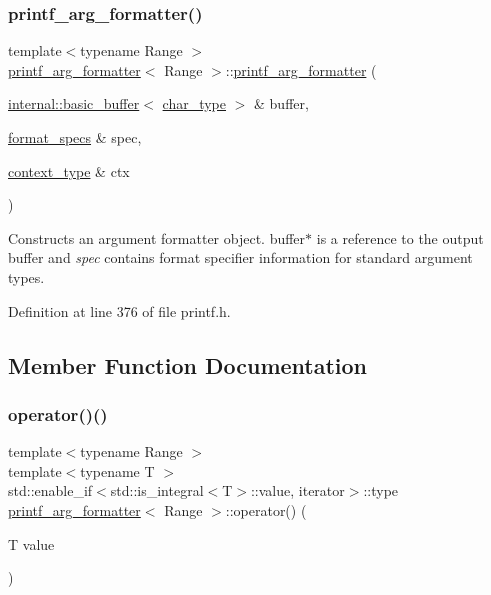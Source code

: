 \subsubsection{\texorpdfstring{printf\+\_\+arg\+\_\+formatter()}{printf\_arg\_formatter()}}
{\footnotesize\ttfamily template$<$typename Range $>$ \\
\hyperlink{classprintf__arg__formatter}{printf\+\_\+arg\+\_\+formatter}$<$ Range $>$\+::\hyperlink{classprintf__arg__formatter}{printf\+\_\+arg\+\_\+formatter} (\begin{DoxyParamCaption}\item[{\hyperlink{classinternal_1_1basic__buffer}{internal\+::basic\+\_\+buffer}$<$ \hyperlink{classinternal_1_1arg__formatter__base_a407930bf282880d2ca45dfa8f5d2034b}{char\+\_\+type} $>$ \&}]{buffer,  }\item[{\hyperlink{classinternal_1_1arg__formatter__base_acff46f7da1afa536210eb77a2ea0d775}{format\+\_\+specs} \&}]{spec,  }\item[{\hyperlink{classbasic__printf__context}{context\+\_\+type} \&}]{ctx }\end{DoxyParamCaption})\hspace{0.3cm}{\ttfamily [inline]}}

Constructs an argument formatter object. buffer$\ast$ is a reference to the output buffer and {\itshape spec} contains format specifier information for standard argument types.  

Definition at line 376 of file printf.\+h.



\subsection{Member Function Documentation}
\mbox{\label{classprintf__arg__formatter_adf72c691ec2561e444ac9520cc158243}} 
\subsubsection{\texorpdfstring{operator()()}{operator()()}\hspace{0.1cm}{\footnotesize\ttfamily [1/8]}}
{\footnotesize\ttfamily template$<$typename Range $>$ \\
template$<$typename T $>$ \\
std\+::enable\+\_\+if$<$std\+::is\+\_\+integral$<$T$>$\+::value, iterator$>$\+::type \hyperlink{classprintf__arg__formatter}{printf\+\_\+arg\+\_\+formatter}$<$ Range $>$\+::operator() (\begin{DoxyParamCaption}\item[{T}]{value }\end{DoxyParamCaption})\hspace{0.3cm}{\ttfamily [inline]}}



